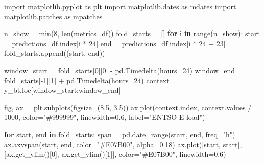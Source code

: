 \documentclass[
  english,
  letterpaper,
]{scrbook}
\newenvironment{Shaded}{\begin{snugshade}}{\end{snugshade}}
\newcommand{\BuiltInTok}[1]{\textcolor[rgb]{0.00,0.23,0.31}{#1}}
\newcommand{\ControlFlowTok}[1]{\textcolor[rgb]{0.00,0.23,0.31}{\textbf{#1}}}
\newcommand{\DecValTok}[1]{\textcolor[rgb]{0.68,0.00,0.00}{#1}}
\newcommand{\FloatTok}[1]{\textcolor[rgb]{0.68,0.00,0.00}{#1}}
\newcommand{\ImportTok}[1]{\textcolor[rgb]{0.00,0.46,0.62}{#1}}
\newcommand{\KeywordTok}[1]{\textcolor[rgb]{0.00,0.23,0.31}{\textbf{#1}}}
\newcommand{\NormalTok}[1]{\textcolor[rgb]{0.00,0.23,0.31}{#1}}
\newcommand{\OperatorTok}[1]{\textcolor[rgb]{0.37,0.37,0.37}{#1}}
\newcommand{\StringTok}[1]{\textcolor[rgb]{0.13,0.47,0.30}{#1}}
\begin{document}
\begin{Shaded}
\begin{Highlighting}[]
\ImportTok{import}\NormalTok{ matplotlib.pyplot }\ImportTok{as}\NormalTok{ plt}
\ImportTok{import}\NormalTok{ matplotlib.dates }\ImportTok{as}\NormalTok{ mdates}
\ImportTok{import}\NormalTok{ matplotlib.patches }\ImportTok{as}\NormalTok{ mpatches}

\NormalTok{n\_show }\OperatorTok{=} \BuiltInTok{min}\NormalTok{(}\DecValTok{8}\NormalTok{, }\BuiltInTok{len}\NormalTok{(metrics\_df))}
\NormalTok{fold\_starts }\OperatorTok{=}\NormalTok{ []}
\ControlFlowTok{for}\NormalTok{ i }\KeywordTok{in} \BuiltInTok{range}\NormalTok{(n\_show):}
\NormalTok{    start }\OperatorTok{=}\NormalTok{ predictions\_df.index[i }\OperatorTok{*} \DecValTok{24}\NormalTok{]}
\NormalTok{    end   }\OperatorTok{=}\NormalTok{ predictions\_df.index[i }\OperatorTok{*} \DecValTok{24} \OperatorTok{+} \DecValTok{23}\NormalTok{]}
\NormalTok{    fold\_starts.append((start, end))}

\NormalTok{window\_start }\OperatorTok{=}\NormalTok{ fold\_starts[}\DecValTok{0}\NormalTok{][}\DecValTok{0}\NormalTok{] }\OperatorTok{{-}}\NormalTok{ pd.Timedelta(hours}\OperatorTok{=}\DecValTok{24}\NormalTok{)}
\NormalTok{window\_end   }\OperatorTok{=}\NormalTok{ fold\_starts[}\OperatorTok{{-}}\DecValTok{1}\NormalTok{][}\DecValTok{1}\NormalTok{] }\OperatorTok{+}\NormalTok{ pd.Timedelta(hours}\OperatorTok{=}\DecValTok{24}\NormalTok{)}
\NormalTok{context }\OperatorTok{=}\NormalTok{ y\_bt.loc[window\_start:window\_end]}

\NormalTok{fig, ax }\OperatorTok{=}\NormalTok{ plt.subplots(figsize}\OperatorTok{=}\NormalTok{(}\FloatTok{8.5}\NormalTok{, }\FloatTok{3.5}\NormalTok{))}
\NormalTok{ax.plot(context.index, context.values }\OperatorTok{/} \DecValTok{1000}\NormalTok{,}
\NormalTok{        color}\OperatorTok{=}\StringTok{"\#999999"}\NormalTok{, linewidth}\OperatorTok{=}\FloatTok{0.6}\NormalTok{, label}\OperatorTok{=}\StringTok{"ENTSO{-}E load"}\NormalTok{)}

\ControlFlowTok{for}\NormalTok{ start, end }\KeywordTok{in}\NormalTok{ fold\_starts:}
\NormalTok{    span }\OperatorTok{=}\NormalTok{ pd.date\_range(start, end, freq}\OperatorTok{=}\StringTok{"h"}\NormalTok{)}
\NormalTok{    ax.axvspan(start, end, color}\OperatorTok{=}\StringTok{"\#E07B00"}\NormalTok{, alpha}\OperatorTok{=}\FloatTok{0.18}\NormalTok{)}
\NormalTok{    ax.plot([start, start], [ax.get\_ylim()[}\DecValTok{0}\NormalTok{], ax.get\_ylim()[}\DecValTok{1}\NormalTok{]],}
\NormalTok{            color}\OperatorTok{=}\StringTok{"\#E07B00"}\NormalTok{, linewidth}\OperatorTok{=}\FloatTok{0.6}\NormalTok{)}


\end{Highlighting}
\end{Shaded}
\end{document}
